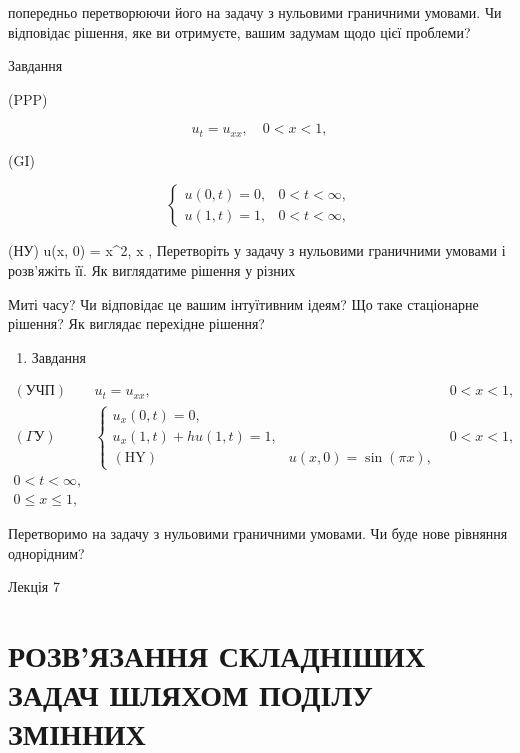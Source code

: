 \documentclass[
  ukrainian,
]{article}
\providecommand{\tightlist}{%
  \setlength{\itemsep}{0pt}\setlength{\parskip}{0pt}}
\begin{document}
попередньо перетворюючи його на задачу з нульовими граничними умовами.
Чи відповідає рішення, яке ви отримуєте, вашим задумам щодо цієї
проблеми?

Завдання

(PPP)

\[
u_t = u_{xx}, \quad 0 < x < 1,
\]

(GI)

\[
\begin{cases} u(0, t) = 0, & 0 < t < \infty, \\ u(1, t) = 1, & 0 < t < \infty, \end{cases}
\]

(НУ) u(x, 0) = x\^{}2,  \le x , Перетворіть у задачу з
нульовими граничними умовами і розв'яжіть її. Як виглядатиме рішення у
різних

Миті часу? Чи відповідає це вашим інтуїтивним ідеям? Що таке стаціонарне
рішення? Як виглядає перехідне рішення?

\begin{enumerate}
\def\labelenumi{\arabic{enumi}.}
\setcounter{enumi}{2}
\tightlist
\item
  Завдання
\end{enumerate}

\[
\begin{aligned} (\text{УЧП}) & u_t = u_{xx}, & 0 < x < 1, \\ (\Gamma \text{У}) & \begin{cases} u_x(0, t) = 0, \\ u_x(1, t) + hu(1, t) = 1, \\ (\text{HY}) & u(x, 0) = \sin(\pi x), \end{cases} & 0 < x < 1, \\ 0 < t < \infty, \\ 0 \le x \le 1, \end{aligned}
\]

Перетворимо на задачу з нульовими граничними умовами. Чи буде нове
рівняння однорідним?

Лекція 7

\section{РОЗВ'ЯЗАННЯ СКЛАДНІШИХ ЗАДАЧ ШЛЯХОМ ПОДІЛУ
ЗМІННИХ}\label{ux440ux43eux437ux432ux44fux437ux430ux43dux43dux44f-ux441ux43aux43bux430ux434ux43dux456ux448ux438ux445-ux437ux430ux434ux430ux447-ux448ux43bux44fux445ux43eux43c-ux43fux43eux434ux456ux43bux443-ux437ux43cux456ux43dux43dux438ux445}
\end{document}
